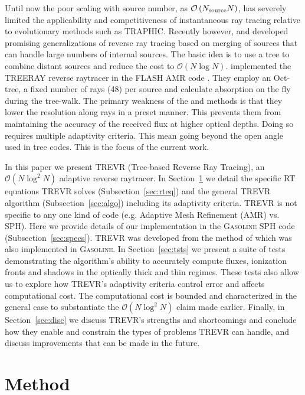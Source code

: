 \documentclass[fleq,usenatbib]{mnras}
\newcommand{\acro}{TREVR}
\newcommand{\bigO}[1]{\mathcal{O}\left(#1\right)}
\newcommand{\NS}{N_{\rm source}}
\begin{document}
{Until now the poor scaling with source number, as $\bigO{\NS N}$, has severely 
limited the applicability and competitiveness of instantaneous ray tracing 
relative to evolutionary methods such as TRAPHIC. Recently however, 
\cite{Woods2015} and \cite{Wunsch2018} developed promising generalizations of 
reverse ray tracing based on merging of sources that can handle large numbers 
of internal sources. The basic idea is to use a tree to combine distant 
sources and reduce the cost to $\bigO{N \log N}$. \cite{Wunsch2018} implemented 
the TREERAY reverse raytracer in the FLASH AMR code \citep{FryxellEt2000}.
They employ an Oct-tree, a fixed number of rays (48) per source and calculate 
absorption on the fly during the tree-walk.  The primary weakness of the 
\cite{Woods2015} and \cite{Wunsch2018} methods is that they lower the resolution 
along rays in a preset manner.  This prevents them from maintaining the 
accuracy of the received flux at higher optical depths. Doing so requires multiple 
adaptivity criteria.  This mean going beyond the open angle used in tree codes.
This is the focus of the current work.

In this paper we present \acro{} (Tree-based Reverse Ray Tracing), an $\bigO{N 
\log^2 N}$ adaptive reverse raytracer. In Section~\ref{sec:mthd} we detail 
the specific RT equations \acro{} solves (Subsection~\ref{sec:rteq}) and the 
general \acro{} algorithm (Subsection~\ref{sec:algo}) including its adaptivity 
criteria. \acro{} is not specific to any one kind of code (e.g. Adaptive Mesh 
Refinement (AMR) vs. SPH). Here we provide details of our implementation in 
the \textsc{Gasoline} SPH code (Subsection~\ref{sec:specs}). \acro{} was 
developed from the method of \cite{Woods2015} which was also implemented in 
\textsc{Gasoline}. In Section~\ref{sec:tsts} we present a suite of tests 
demonstrating the algorithm's ability to accurately compute fluxes, ionization 
fronts and shadows in the optically thick and thin regimes. These tests also 
allow us to explore how \acro{}'s adaptivity criteria control error and 
affects computational cost. The computational cost is bounded and 
characterized in the general case to substantiate the $\bigO{N \log^2 N}$ 
claim made earlier. Finally, in Section~\ref{sec:disc} we discuss \acro{}'s 
strengths and shortcomings and conclude how they enable and constrain the 
types of problems \acro{} can handle, and discuss improvements that can be 
made in the future.

\section{Method}\label{sec:mthd}
}
\end{document}
